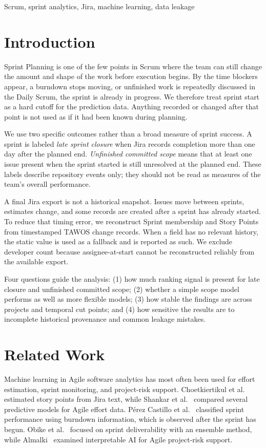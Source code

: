 \documentclass[conference]{IEEEtran}
\begin{document}
\begin{IEEEkeywords}
Scrum, sprint analytics, Jira, machine learning, data leakage
\end{IEEEkeywords}

\section{Introduction}
Sprint Planning is one of the few points in Scrum where the team can still change the amount and shape of the work before execution begins. By the time blockers appear, a burndown stops moving, or unfinished work is repeatedly discussed in the Daily Scrum, the sprint is already in progress. We therefore treat sprint start as a hard cutoff for the prediction data. Anything recorded or changed after that point is not used as if it had been known during planning.

We use two specific outcomes rather than a broad measure of sprint success. A sprint is labeled \emph{late sprint closure} when Jira records completion more than one day after the planned end. \emph{Unfinished committed scope} means that at least one issue present when the sprint started is still unresolved at the planned end. These labels describe repository events only; they should not be read as measures of the team's overall performance.

A final Jira export is not a historical snapshot. Issues move between sprints, estimates change, and some records are created after a sprint has already started. To reduce that timing error, we reconstruct Sprint membership and Story Points from timestamped TAWOS change records. When a field has no relevant history, the static value is used as a fallback and is reported as such. We exclude developer count because assignee-at-start cannot be reconstructed reliably from the available export.

Four questions guide the analysis: (1) how much ranking signal is present for late closure and unfinished committed scope; (2) whether a simple scope model performs as well as more flexible models; (3) how stable the findings are across projects and temporal cut points; and (4) how sensitive the results are to incomplete historical provenance and common leakage mistakes.

\section{Related Work}
Machine learning in Agile software analytics has most often been used for effort estimation, sprint monitoring, and project-risk support. Choetkiertikul et al.~\cite{choetkiertikul2019} estimated story points from Jira text, while Shankar et al.~\cite{shankar2026} compared several predictive models for Agile effort data. P\'erez Castillo et al.~\cite{perezcastillo2024} classified sprint performance using burndown information, which is observed after the sprint has begun. Obike et al.~\cite{obike2025} focused on sprint deliverability with an ensemble method, while Almalki~\cite{almalki2025} examined interpretable AI for Agile project-risk support.
\end{document}
